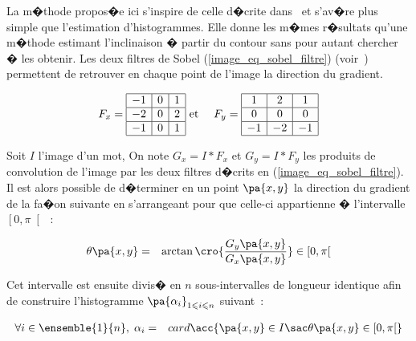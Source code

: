 La m�thode propos�e ici s'inspire de celle d�crite dans~ et s'av�re plus simple que l'estimation d'histogrammes. Elle donne les m�mes r�sultats qu'une m�thode estimant l'inclinaison � partir du contour sans pour autant chercher � les obtenir. Les deux filtres de Sobel (\ref{image_eq_sobel_filtre}) (voir~) permettent de retrouver en chaque point de l'image la direction du gradient. 


            \begin{eqnarray}
            F_x = 
            \begin{array}{|c|c|c|} \hline
            -1 & 0 & 1 \\ \hline
            -2 & 0 & 2 \\ \hline
            -1 & 0 & 1 \\ \hline
            \end{array}
            &
            \text{ et }
            &
            F_y =
            \begin{array}{|c|c|c|} \hline
             1 & 2 & 1 \\ \hline
             0 & 0 & 0 \\ \hline
            -1 & -2 & -1 \\ \hline
            \end{array}
            \label{image_eq_sobel_filtre}
            \end{eqnarray}


Soit $I$ l'image d'un mot, On note $G_x = I * F_x$ et $G_y = I * F_y$ les produits de convolution de l'image par les deux filtres d�crits en (\ref{image_eq_sobel_filtre}). Il est alors possible de d�terminer en un point $\pa{x,y}$ la direction du gradient de la fa�on suivante en s'arrangeant pour que celle-ci appartienne � l'intervalle $\left[0,\pi \right[$~:

            \begin{eqnarray}
            \theta\pa{x,y} &=& \arctan\cro{\dfrac{G_y\pa{x,y}}{G_x\pa{x,y}}} 
            \in \left[0,\pi \right[
            \end{eqnarray}


Cet intervalle est ensuite divis� en $n$ sous-intervalles de longueur identique afin de construire l'histogramme $\pa{\alpha_i}_{1 \leqslant i \leqslant n}$ suivant~:


        \begin{eqnarray}
        \forall i \in \ensemble{1}{n}, \; \alpha_i &=&  card 
        \acc{ \pa{x,y} \in I \sac \theta\pa{x,y} \in \left[0,\pi \right[ } \nonumber
        \end{eqnarray}


